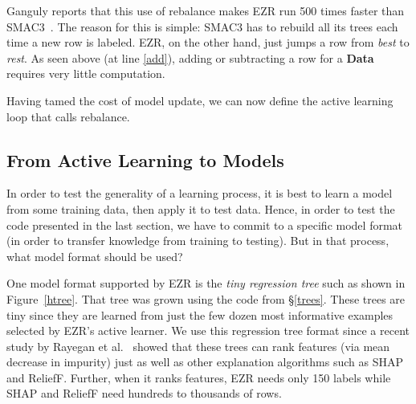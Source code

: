 \documentclass[AMA,STIX2COL]{WileyNJDv5}
\newcommand{\cls}[1]{%
  \setlength{\fboxsep}{1.5pt}%
  \colorbox{clsbg}{\sffamily\bfseries{#1}}%
}
\begin{document}
{Ganguly reports  that this use of   \textsf{rebalance}
makes EZR run
 500 times faster than SMAC3~\cite{ganguly2026lowgodatalightse}.  
The reason for this is simple: 
 SMAC3 has to rebuild
all its trees each time a new row is labeled.
EZR, on the other hand, just jumps a row from
{\em best} to {\em rest}.
As seen above (at line \ref{add}), adding or subtracting a row for a \cls{Data} requires very little computation.  

Having tamed the cost of model update, we can now define the active learning loop that calls
\textsf{rebalance}.

 \subsection{ From Active Learning to Models}
In order to test the generality
 of a learning process,
 it is best to learn a model
 from some training data, then apply it to
 test data.
 Hence, in order to test the code presented
 in the last section,
 we have to commit
 to a specific  model format (in order to transfer knowledge from   training to testing). But in that process, what model format should be used?







 One model format supported by EZR is the {\em tiny regression tree}
 such as shown in 
Figure~\ref{htree}.
That tree was grown using the code from \S\ref{trees}.
These trees are tiny since they are learned   from just the few dozen most
informative examples selected by EZR's active learner.
We use this regression tree format since a recent study by
 Rayegan et al.~\cite{Amiraliminimaldata} showed that these trees can rank features   (via mean decrease in impurity) just as well as other explanation
 algorithms such as  SHAP and ReliefF. Further, when it ranks features,
 EZR needs only  150 labels while SHAP and ReliefF need
 hundreds to thousands of rows.
 
}
\end{document}

